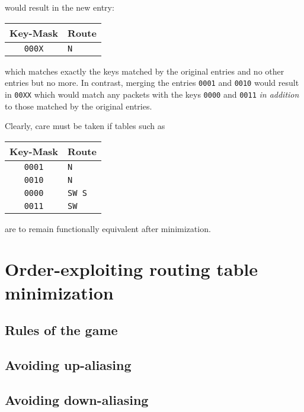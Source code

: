 \documentclass[conference]{IEEEtran}
\newcommand{\mytt}[1]{\texttt{\footnotesize#1}}
\begin{document}
  \noindent would result in the new entry:

  \begin{table}[H]
    \centering
    \begin{tabular}{c l}
      \toprule
      Key-Mask & Route \\
      \midrule
      \texttt{000X} & \texttt{N}\\
      \bottomrule
    \end{tabular}
  \end{table}

  \noindent which matches exactly the keys matched by the original entries and no other entries but no more.
  In contrast, merging the entries \mytt{0001} and \mytt{0010} would result in \mytt{00XX} which would match any packets with the keys \mytt{0000} and \mytt{0011} \textit{in addition} to those matched by the original entries.

  Clearly, care must be taken if tables such as

  \begin{table}[H]
    \centering
    \begin{tabular}{c l}
      \toprule
      Key-Mask & Route \\
      \midrule
      \texttt{0001} & \texttt{N}\\
      \texttt{0010} & \texttt{N}\\
      \texttt{0000} & \texttt{SW S}\\
      \texttt{0011} & \texttt{SW}\\
      \bottomrule
    \end{tabular}
  \end{table}

  \noindent are to remain functionally equivalent after minimization.

  \section{Order-exploiting routing table minimization}

  \subsection{Rules of the game}

  \subsection{Avoiding up-aliasing}

  \subsection{Avoiding down-aliasing}
\end{document}
